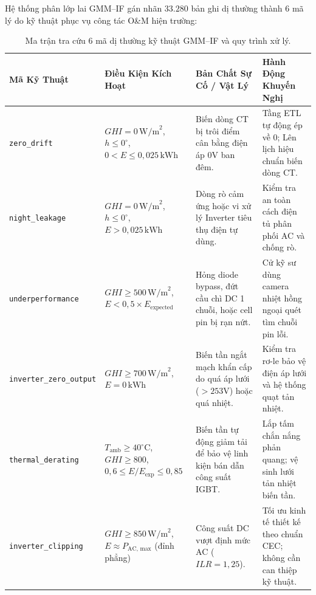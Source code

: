 \documentclass[12pt, a4paper]{report}
\begin{document}
Hệ thống phân lớp lai GMM--IF gán nhãn $33.280$ bản ghi dị thường thành 6 mã lý do kỹ thuật phục vụ công tác O\&M hiện trường:

\begin{table}[H]
\centering
\footnotesize
\renewcommand{\arraystretch}{1.35}
\begin{tabularx}{\textwidth}{@{} >{\raggedright\arraybackslash}p{2.6cm} >{\raggedright\arraybackslash}p{3.4cm} >{\raggedright\arraybackslash}X >{\raggedright\arraybackslash}X @{}}
\toprule
\textbf{Mã Kỹ Thuật} & \textbf{Điều Kiện Kích Hoạt} & \textbf{Bản Chất Sự Cố / Vật Lý} & \textbf{Hành Động Khuyến Nghị} \\
\midrule
\texttt{zero\_drift} & $GHI = 0\,\text{W/m}^2$, $h \le 0^\circ$,\newline $0 < E \le 0{,}025\,\text{kWh}$ & Biến dòng CT bị trôi điểm cân bằng điện áp 0V ban đêm. & Tầng ETL tự động ép về $0$; Lên lịch hiệu chuẩn biến dòng CT. \\
\midrule
\texttt{night\_leakage} & $GHI = 0\,\text{W/m}^2$, $h \le 0^\circ$,\newline $E > 0{,}025\,\text{kWh}$ & Dòng rò cảm ứng hoặc vi xử lý Inverter tiêu thụ điện tự dùng. & Kiểm tra an toàn cách điện tủ phân phối AC và chống rò. \\
\midrule
\texttt{underperformance} & $GHI \ge 500\,\text{W/m}^2$,\newline $E < 0{,}5 \times E_{\text{expected}}$ & Hỏng diode bypass, đứt cầu chì DC 1 chuỗi, hoặc cell pin bị rạn nứt. & Cử kỹ sư dùng camera nhiệt hồng ngoại quét tìm chuỗi pin lỗi. \\
\midrule
\texttt{inverter\_zero\_}\newline\texttt{output} & $GHI \ge 700\,\text{W/m}^2$,\newline $E = 0\,\text{kWh}$ & Biến tần ngắt mạch khẩn cấp do quá áp lưới ($>253\text{V}$) hoặc quá nhiệt. & Kiểm tra rơ-le bảo vệ điện áp lưới và hệ thống quạt tản nhiệt. \\
\midrule
\texttt{thermal\_}\newline\texttt{derating} & $T_{\text{amb}} \ge 40^\circ\text{C}$, $GHI \ge 800$,\newline $0{,}6 \le E/E_{\text{exp}} \le 0{,}85$ & Biến tần tự động giảm tải để bảo vệ linh kiện bán dẫn công suất IGBT. & Lắp tấm chắn nắng phản quang; vệ sinh lưới tản nhiệt biến tần. \\
\midrule
\texttt{inverter\_}\newline\texttt{clipping} & $GHI \ge 850\,\text{W/m}^2$,\newline $E \approx P_{\text{AC, max}}$ (đỉnh phẳng) & Công suất DC vượt định mức AC ($ILR = 1{,}25$). & Tối ưu kinh tế thiết kế theo chuẩn CEC; không cần can thiệp kỹ thuật. \\
\bottomrule
\end{tabularx}
\caption{Ma trận tra cứu 6 mã dị thường kỹ thuật GMM--IF và quy trình xử lý.}
\label{tab:outlier_matrix_detail}
\end{table}
\end{document}
